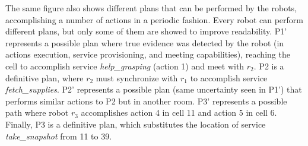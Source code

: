 The same figure also shows different plans that can be performed by the robots, accomplishing a number of actions in a periodic fashion.
Every robot can perform different plans, but only some of them are showed to improve readability.
P1' represents a possible plan where  true evidence was detected by the robot (in actions execution, service provisioning, and meeting capabilities), reaching the cell to accomplish service \emph{help\_grasping} (action 1) and meet with $r_2$.
P2 is a definitive plan,  where $r_2$ must synchronize with $r_1$ to accomplish service \emph{fetch\_supplies}.
P2' represents a possible plan (same uncertainty seen in P1') that performs similar actions to P2 but in another room.
P3' represents a possible path where robot $r_3$ accomplishes action 4 in cell 11 and action 5 in cell 6.
Finally, P3 is a definitive plan, which substitutes the location of service \emph{take\_snapshot} from 11 to 39.






